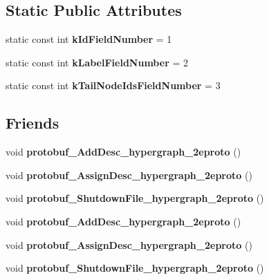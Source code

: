 \subsection*{Static Public Attributes}
\begin{DoxyCompactItemize}
\item 
\hypertarget{classHypergraph__Edge_a3ef9526f4e83b7d3b6e84b53869823ba}{
static const int {\bfseries kIdFieldNumber} = 1}
\label{classHypergraph__Edge_a3ef9526f4e83b7d3b6e84b53869823ba}

\item 
\hypertarget{classHypergraph__Edge_ae0a899443488a0d046a4ccdef8f86443}{
static const int {\bfseries kLabelFieldNumber} = 2}
\label{classHypergraph__Edge_ae0a899443488a0d046a4ccdef8f86443}

\item 
\hypertarget{classHypergraph__Edge_a93fa914d403a510e5b9e14fa529e5b35}{
static const int {\bfseries kTailNodeIdsFieldNumber} = 3}
\label{classHypergraph__Edge_a93fa914d403a510e5b9e14fa529e5b35}

\end{DoxyCompactItemize}
\subsection*{Friends}
\begin{DoxyCompactItemize}
\item 
\hypertarget{classHypergraph__Edge_aed4781a70bb54c95ce4bb1aa4f20b05c}{
void {\bfseries protobuf\_\-AddDesc\_\-hypergraph\_\-2eproto} ()}
\label{classHypergraph__Edge_aed4781a70bb54c95ce4bb1aa4f20b05c}

\item 
\hypertarget{classHypergraph__Edge_a3cbaa41d7f7b73db437c4e7d1edcb4f3}{
void {\bfseries protobuf\_\-AssignDesc\_\-hypergraph\_\-2eproto} ()}
\label{classHypergraph__Edge_a3cbaa41d7f7b73db437c4e7d1edcb4f3}

\item 
\hypertarget{classHypergraph__Edge_a424acd7e96228bbed0dba9436582d3c1}{
void {\bfseries protobuf\_\-ShutdownFile\_\-hypergraph\_\-2eproto} ()}
\label{classHypergraph__Edge_a424acd7e96228bbed0dba9436582d3c1}

\item 
\hypertarget{classHypergraph__Edge_aed4781a70bb54c95ce4bb1aa4f20b05c}{
void {\bfseries protobuf\_\-AddDesc\_\-hypergraph\_\-2eproto} ()}
\label{classHypergraph__Edge_aed4781a70bb54c95ce4bb1aa4f20b05c}

\item 
\hypertarget{classHypergraph__Edge_a3cbaa41d7f7b73db437c4e7d1edcb4f3}{
void {\bfseries protobuf\_\-AssignDesc\_\-hypergraph\_\-2eproto} ()}
\label{classHypergraph__Edge_a3cbaa41d7f7b73db437c4e7d1edcb4f3}

\item 
\hypertarget{classHypergraph__Edge_a424acd7e96228bbed0dba9436582d3c1}{
void {\bfseries protobuf\_\-ShutdownFile\_\-hypergraph\_\-2eproto} ()}
\label{classHypergraph__Edge_a424acd7e96228bbed0dba9436582d3c1}

\end{DoxyCompactItemize}


